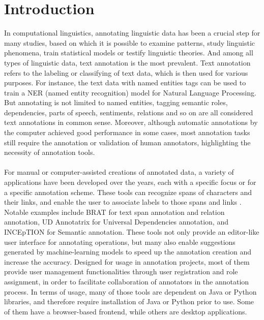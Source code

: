 \documentclass[12ptm a4paper]{article}
\begin{document}
\section{Introduction}
In computational linguistics, annotating linguistic data has been a crucial step for many studies, based on which it is possible to examine patterns, study linguistic phenomena, train statistical models or testify linguistic theories. And among all types of linguistic data, text annotation is the most prevalent. Text annotation refers to the labeling or classifying of text data, which is then used for various purposes. For instance, the text data with named entities tags can be used to train a NER (named entity recognition) model for Natural Language Processing. But annotating is not limited to named entities, tagging semantic roles, dependencies, parts of speech, sentiments, relations and so on are all considered text annotations in common sense. Moreover, although automatic annotations by the computer achieved good performance in some cases, most annotation tasks still require the annotation or validation of human annotators, highlighting the necessity of annotation tools.\\
\\
For manual or computer-assisted creations of annotated data, a variety of applications have been developed over the years, each with a specific focus or for a specific annotation scheme. These tools can recognize spans of characters and their links, and enable the user to associate labels to those spans and links \citep{inbook}. Notable examples include BRAT for text span annotation and relation annotation, UD Annotatrix for Universal Dependencies annotation, and INCEpTION for Semantic annotation. These tools not only provide an editor-like user interface for annotating operations, but many also enable suggestions generated by machine-learning models to speed up the annotation creation and increase the accuracy. Designed for usage in annotation projects, most of them provide user management functionalities through user registration and role assignment, in order to facilitate collaboration of annotators in the annotation process. In terms of usage, many of those tools are dependent on Java or Python libraries, and therefore require installation of Java or Python prior to use. Some of them have a browser-based frontend, while others are desktop applications.\\
\\
\end{document}
